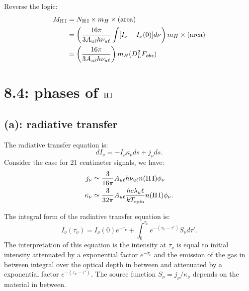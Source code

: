 \documentclass[12pt,letterpaper]{article}
\newcommand{\hi}{\textrm{H\,I}}
\begin{document}
Reverse the logic:
\begin{equation}
    \begin{split}
        M_{\hi} &= N_{\hi} \times m_{H} \times (\textrm{area})\\
        &= \left( \frac{16 \pi}{3 A_{u \ell} h \nu_{u \ell}} 
        \int [I_\nu - I_\nu(0)]d\nu
        \right)
        m_{H} 
        \times
        (\textrm{area}) \\
        &= \left( \frac{16 \pi}{3 A_{u \ell} h \nu_{u \ell}} \right)
        m_{H} 
        (D_{L}^2 F_{obs})
    \end{split}
\end{equation}

\section*{8.4: phases of $\hi$}

\subsection*{(a): radiative transfer}
The radiative transfer equation is:
\begin{equation}
    dI_\nu = -I_\nu \kappa_\nu ds + j_\nu ds.
\end{equation}
Consider the case for 21 centimeter signals, we have:
\begin{equation*}
    \begin{split}
        j_\nu &\simeq \frac{3}{16 \pi} A_{u \ell} h \nu_{u \ell} n(\hi) \phi_\nu\\
        \kappa_\nu &\simeq \frac{3}{32 \pi} A_{u \ell} \frac{h c \lambda_u \ell}{k T_{\textrm{spin}}} n(\hi) \phi_\nu.
    \end{split}
\end{equation*}

The integral form of the radiative transfer equation is:
\begin{equation}
    I_\nu (\tau_\nu) = I_\nu (0) e^{-\tau_\nu} 
    + \int_0^{\tau_\nu} e^{-(\tau_\nu - \tau')} S_\nu d\tau'.
\end{equation}
The interpretation of this equation is the intensity at $\tau_\nu$ is equal to initial intensity attenuated by a exponential factor $e^{-\tau_\nu}$ and the emission of the gas in between integral over the optical depth in between and attenuated by a exponential factor $e^{-(\tau_\nu - \tau')}$.
The source function $S_\nu = j_\nu / \kappa_\nu$ depends on the material in between.
\end{document}
